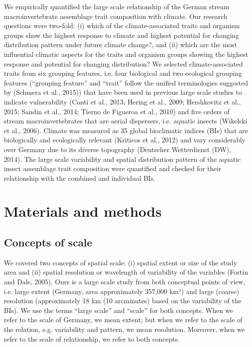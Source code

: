 We empirically quantified the large scale relationship of the German stream macroinvertebrate assemblage trait composition with climate. Our research questions were two-fold: (i) which of the climate-associated traits and organism groups show the highest response to climate and highest potential for changing distribution pattern under future climate change?, and (ii) which are the most influential climatic aspects for the traits and organism groups showing the highest response and potential for changing distribution? We selected climate-associated traits from six grouping features, i.e. four biological and two ecological grouping features (“grouping feature” and “trait” follow the unified terminologies suggested by (Schmera et al., 2015)) that have been used in previous large scale studies to indicate vulnerability (Conti et al., 2013; Hering et al., 2009; Hershkovitz et al., 2015; Sandin et al., 2014; Tierno de Figueroa et al., 2010) and five orders of stream macroinvertebrates that are aerial dispersers, i.e. aquatic insects (Wikelski et al., 2006). Climate was measured as 35 global bioclimatic indices (BIs) that are biologically and ecologically relevant (Kriticos et al., 2012) and vary considerably over Germany due to its diverse topography (Deutscher Wetterdienst (DW), 2014). The large scale variability and spatial distribution pattern of the aquatic insect assemblage trait composition were quantified and checked for their relationship with the combined and individual BIs.

\section{Materials and methods}
\label{Materials and methods}

\subsection{Concepts of scale}
\label{Concepts of scale}

We covered two concepts of spatial scale: (i) spatial extent or size of the study area and (ii) spatial resolution or wavelength of variability of the variables (Fortin and Dale, 2005). Ours is a large scale study from both conceptual points of view, i.e. large extent (Germany, area approximately 357,000 km²) and large (coarse) resolution (approximately 18 km (10 arcminutes) based on the variability of the BIs). We use the terms “large scale” and “scale” for both concepts. When we refer to the scale of Germany, we mean extent; but when we refer to the scale of the relation, e.g. variability and pattern, we mean resolution. Moreover, when we refer to the scale of relationship, we refer to both concepts.

